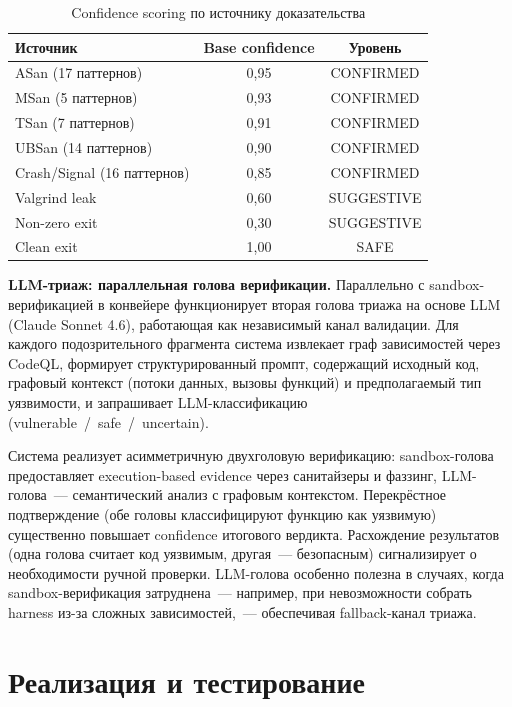 \documentclass[runningheads]{llncs}
\begin{document}
\begin{table}
\centering
\caption{Confidence scoring по источнику доказательства}
\label{tab:confidence}
\small
\begin{tabular}{|l|c|c|}
\hline
\textbf{Источник} & \textbf{Base confidence} & \textbf{Уровень} \\
\hline
ASan (17 паттернов) & 0,95 & CONFIRMED \\
MSan (5 паттернов) & 0,93 & CONFIRMED \\
TSan (7 паттернов) & 0,91 & CONFIRMED \\
UBSan (14 паттернов) & 0,90 & CONFIRMED \\
Crash/Signal (16 паттернов) & 0,85 & CONFIRMED \\
Valgrind leak & 0,60 & SUGGESTIVE \\
Non-zero exit & 0,30 & SUGGESTIVE \\
Clean exit & 1,00 & SAFE \\
\hline
\end{tabular}
\end{table}

\textbf{LLM-триаж: параллельная голова верификации.}
Параллельно с sandbox-верификацией в конвейере функционирует вторая голова триажа на основе LLM (Claude Sonnet 4.6), работающая как независимый канал валидации. Для каждого подозрительного фрагмента система извлекает граф зависимостей через CodeQL, формирует структурированный промпт, содержащий исходный код, графовый контекст (потоки данных, вызовы функций) и предполагаемый тип уязвимости, и запрашивает LLM-классификацию (vulnerable~/~safe~/~uncertain).

Система реализует асимметричную двухголовую верификацию: sandbox-голова предоставляет execution-based evidence через санитайзеры и фаззинг, LLM-голова~--- семантический анализ с графовым контекстом. Перекрёстное подтверждение (обе головы классифицируют функцию как уязвимую) существенно повышает confidence итогового вердикта. Расхождение результатов (одна голова считает код уязвимым, другая~--- безопасным) сигнализирует о необходимости ручной проверки. LLM-голова особенно полезна в случаях, когда sandbox-верификация затруднена~--- например, при невозможности собрать harness из-за сложных зависимостей,~--- обеспечивая fallback-канал триажа.


\section{Реализация и тестирование}
\end{document}
